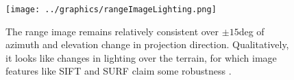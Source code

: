 \begin{figure}[htbp]
   \centering
   \texttt{[image: ../graphics/rangeImageLighting.png]} %
   \caption{The range image remains relatively consistent over $\pm 15$deg of azimuth and elevation change in projection direction. Qualitatively, it looks like changes in lighting over the terrain, for which image features like SIFT and SURF claim some robustness \cite{citationneeded}.}
   \label{fig:rangeImage}
\end{figure}

% 
%
%
% 
% 
%
%
%
%
%

